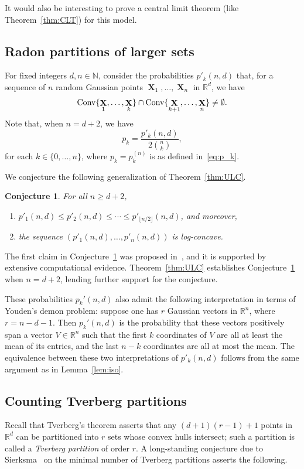 \documentclass[12pt,english,reqno]{amsart}
\theoremstyle{plain}
\newtheorem{conj}[thm]{Conjecture}
\theoremstyle{remark}
\numberwithin{figure}{section}
\numberwithin{equation}{section}
\def\rr{\mathbb{R}}
\DeclareMathOperator{\Xb}{\mathbf{X}} %
\def\ap{p} %
\newcommand{\darkblue}{\color{darkblue}}
\newcommand{\defnb}[1]{\emph{\darkblue #1}}
\begin{document}
It would also be interesting to prove a central limit theorem (like Theorem~\ref{thm:CLT}) for this model.

\subsection*{Radon partitions of larger sets} For fixed integers $d,n \in \mathbb{N}$, consider the probabilities $\ap'_k(n,d)$ that, for a sequence of $n$ random Gaussian points $\Xb_1,\dots,\Xb_n$ in $\mathbb R^{d}$, we have
\[\textnormal{Conv} \{\Xb_1,\dots, \Xb_k\} \cap \textnormal{Conv} \{\Xb_{k+1},\dots, \Xb_n\} \ne \emptyset.\]
Note that, when $n=d+2$, we have
\[ \ap_k = \frac{\ap'_k(n,d)}{2 \binom{n}{k}},\]
for each $k \in \{0,\dots,n\}$, where $p_k=p_k^{(n)}$ is as defined in~\eqref{eq:p_k}.

We conjecture the following generalization of Theorem~\ref{thm:ULC}.
\begin{conj}\label{conj:White}
For all $n \ge d+2$,
\begin{enumerate}
	\item\label{it:White-1} $\ap'_1(n,d) \le \ap'_2(n,d) \le \cdots \le \ap'_{\lfloor n/2 \rfloor}(n,d)$, and moreover,
	\item\label{it:White-2} the sequence $(\ap'_1(n,d),\dots, \ap'_n(n,d))$ is log-concave.
\end{enumerate}
\end {conj}

The first claim in Conjecture~\ref{conj:White} was proposed in~\citep{White}, and it is supported by extensive computational evidence. Theorem~\ref{thm:ULC} establishes Conjecture~\ref{conj:White} when $n = d + 2$, lending further support for the conjecture.

These probabilities \( \ap_k'(n,d) \) also admit the following interpretation in terms of Youden's demon problem:
suppose one has \( r \) Gaussian vectors in \( \rr^n \), where \( r = n - d - 1 \). Then \( \ap_k'(n,d) \) is the probability that these vectors positively span a vector \( V \in \mathbb{R}^n \) such that the first \( k \) coordinates of \( V \) are all at least the mean of its entries, and the last \( n - k \) coordinates are all at most the mean. The equivalence between these two interpretations of \( \ap'_k(n,d) \) follows from the same argument as in Lemma~\ref{lem:iso}.

\subsection* {Counting Tverberg partitions} Recall that Tverberg's theorem asserts that any $(d+1)(r-1)+1$ points in $\rr^d$ can be partitioned into $r$ sets whose convex hulls intersect; such a partition is called a \defnb{Tverberg partition} of order $r$.
A long-standing conjecture due to Sierksma~\citep{Sie79} on the minimal number of Tverberg partitions asserts the following.
\end{document}
